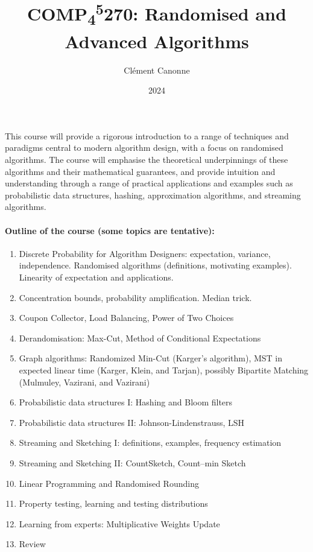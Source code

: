 \documentclass[a4paper]{tufte-book}
\title{COMP\textsubscript{4}\textsuperscript{5}270: Randomised and Advanced Algorithms}
\author{Cl\'ement Canonne}
\date{2024}
\begin{document}
\frontmatter
\maketitle
This course will provide a rigorous introduction to a range of techniques and paradigms central to modern algorithm design, with a focus on randomised algorithms. The course will 
emphasise the theoretical underpinnings of these algorithms and their mathematical guarantees, and provide intuition and understanding through a range of practical applications and examples such as probabilistic data structures, hashing, approximation algorithms, and streaming algorithms.


\paragraph{Outline of the course (some topics are tentative):}
\begin{enumerate}
    \item Discrete Probability for Algorithm Designers: expectation, variance, independence. Randomised algorithms (definitions, motivating examples). Linearity of expectation and applications.
    \item Concentration bounds, probability amplification. Median trick.
    \item Coupon Collector, Load Balancing, Power of Two Choices
    \item Derandomisation: Max-Cut, Method of Conditional Expectations
    \item Graph algorithms: Randomized Min-Cut (Karger’s algorithm), MST in expected linear time (Karger, Klein, and Tarjan), possibly Bipartite Matching (Mulmuley, Vazirani, and Vazirani)
    \item Probabilistic data structures I: Hashing and Bloom filters
    \item Probabilistic data structures II: Johnson-Lindenstrauss, LSH
    \item Streaming and Sketching I: definitions, examples, frequency estimation
    \item Streaming and Sketching II: CountSketch, Count–min Sketch
    \item Linear Programming and Randomised Rounding
    \item Property testing, learning and testing distributions
    \item Learning from experts: Multiplicative Weights Update
    \item Review
\end{enumerate}
\end{document}
